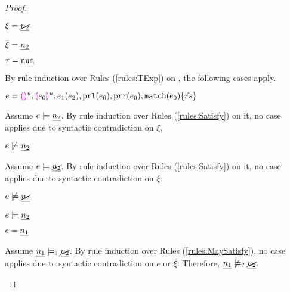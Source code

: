 \begin{proof}
\begin{byCases}
\item[\text{(\ref{rule:CTNotNum})}]
    \begin{pfsteps*}
    \item $\xi=\underline{\cancel{n_2}}$ 
    \item $\overline{\xi}=\underline{n_2}$ 
    \item $\tau=\mathtt{num}$ 
    \end{pfsteps*}
    By rule induction over Rules (\ref{rules:TExp}) on , the following cases apply.
    \begin{byCases}
    \item[\text{(\ref{rule:TEHole}),(\ref{rule:THole}),(\ref{rule:TAp}),(\ref{rule:TPrl}),(\ref{rule:TPrr}),(\ref{rule:TMatchZPre}),(\ref{rule:TMatchNZPre})}]
        \begin{pfsteps*}
        \item $e=\textcolor{violet}{\llparenthesis}\textcolor{violet}{\rrparenthesis}^{u},\textcolor{violet}{\llparenthesis} e_0\textcolor{violet}{\rrparenthesis}^{u},e_1(e_2),\mathtt{prl}(e_0),\mathtt{prr}(e_0),\mathtt{match}(e_0) \{\hat{rs}\}$ 
        \end{pfsteps*}
        Assume $e \models \underline{n_2}$. By rule induction over Rules (\ref{rules:Satisfy}) on it, no case applies due to syntactic contradiction on $\xi$.
        \begin{pfsteps*}
        \item $e \not\models \underline{n_2}$  
        \end{pfsteps*}
        Assume $e \models \underline{\cancel{n_2}}$. By rule induction over Rules (\ref{rules:Satisfy}) on it, no case applies due to syntactic contradiction on $\xi$.
        \begin{pfsteps*}
        \item $e \not\models \underline{\cancel{n_2}}$  
        \item $e \models \underline{n_2}$ 
        \end{pfsteps*}
    \item[\text{(\ref{rule:TNum})}]
        \begin{pfsteps*}
        \item $e=\underline{n_1}$ 
        \end{pfsteps*}
        Assume $\underline{n_1} \models_{?} \underline{\cancel{n_2}}$. By rule induction over Rules (\ref{rules:MaySatisfy}), no case applies due to syntactic contradiction on $e$ or $\xi$.
        Therefore, $\underline{n_1} \not\models_{?} \underline{\cancel{n_2}}$.
        

\end{byCases}
\end{byCases}
\end{proof}
